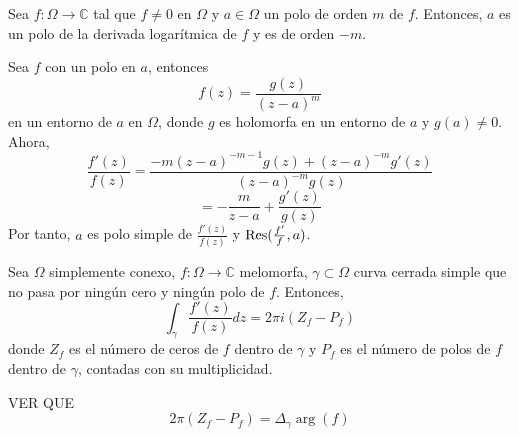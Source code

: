 \begin{prop}
  Sea $f : \Omega \to \mathbb{C}$ tal que $f \neq 0$ en $\Omega$ y $a \in \Omega$ un polo de orden $m$ de $f$. Entonces, $a$ es un polo de la derivada logarítmica de $f$ y es de orden $-m$.
\end{prop}

\begin{dem}
  Sea $f$ con un polo en $a$, entonces
  \[ 
    f(z) = \frac{g(z)}{(z - a)^m} 
  \] 
  en un entorno de $a$ en $\Omega$, donde $g$ es holomorfa en un entorno de $a$ y $g(a) \neq 0$. Ahora, 
  \[ 
    \frac{f'(z)}{f(z)} = \frac{-m(z - a)^{-m-1} g(z) + (z - a)^{-m} g'(z)}{(z - a)^{-m}g(z)} 
  \] 
  \[ 
    = - \frac{m}{z - a} + \frac{g'(z)}{g(z)}
  \] 
  Por tanto, $a$ es polo simple de $\frac{f'(z)}{f(z)}$ y $\operatorname{Res}(\frac{f'}{f}, a)$.
\end{dem}

\begin{theo}
  Sea $\Omega$ simplemente conexo, $f : \Omega \to \mathbb{C}$ melomorfa, $\gamma \subset \Omega$ curva cerrada simple que no pasa por ningún cero y ningún polo de $f$. Entonces,
  \[ 
    \int_{\gamma}^{} \frac{f'(z)}{f(z)} dz = 2 \pi i  (Z_{f} - P_{f})
  \]
  donde $Z_{f}$ es el número de ceros de $f$ dentro de $\gamma$ y $P_{f}$ es el número de polos de $f$ dentro de $\gamma$, contadas con su multiplicidad.
\end{theo}

\begin{note}
  VER QUE
  \[
    2 \pi (Z_{f} - P_{f}) = \Delta_{\gamma} \arg(f)
  \]
\end{note}
